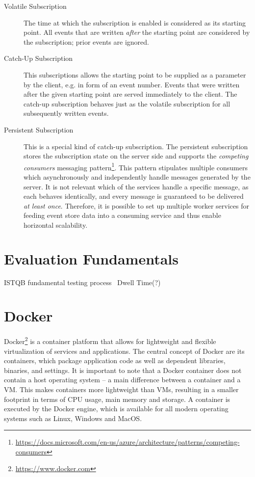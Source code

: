 \begin{description}
\item[Volatile Subscription]
The time at which the subscription is enabled is considered as its starting point.
All events that are written \emph{after} the starting point are considered by the subscription; prior events are ignored.
\item[Catch-Up Subscription]
This subscriptions allows the starting point to be supplied as a parameter by the client, e.g. in form of an event number.
Events that were written after the given starting point are served immediately to the client.
The catch-up subscription behaves just as the volatile subscription for all subsequently written events.
\item[Persistent Subscription] 
This is a special kind of catch-up subscription.
The persistent subscription stores the subscription state on the server side and supports the \emph{competing consumers} messaging pattern\footnote{\url{https://docs.microsoft.com/en-us/azure/architecture/patterns/competing-consumers}}.
This pattern stipulates multiple consumers which asynchronously and independently handle messages generated by the server.
It is not relevant which of the services handle a specific message, as each behaves identically, and every message is guaranteed to be delivered \emph{at least once}.
Therefore, it is possible to set up multiple worker services for feeding event store data into a consuming service and thus enable horizontal scalability.
\end{description}

\section{Evaluation Fundamentals}
\label{sec:fundamentals:evaluation}

ISTQB fundamental testing process~\cite{graham2008foundations}
Dwell Time(?)~\cite{Liu2010}\cite{Kim2014}

\section{Docker}
\label{sec:fundamentals:docker}

Docker\footnote{\url{https://www.docker.com}} is a container platform that allows for lightweight and flexible virtualization of services and applications.
The central concept of Docker are its containers, which package application code as well as dependent libraries, binaries, and settings.
It is important to note that a Docker container does not contain a host operating system -- a main difference between a container and a \ac{VM}.
This makes containers more lightweight than \ac{VM}s, resulting in a smaller footprint in terms of CPU usage, main memory and storage.
A container is executed by the Docker engine, which is available for all modern operating systems such as Linux, Windows and MacOS.

